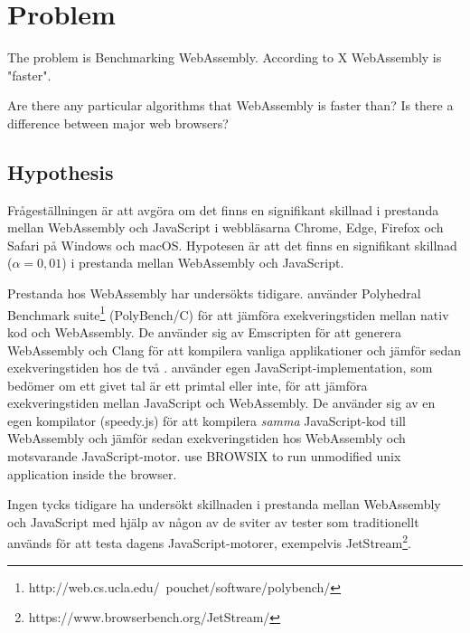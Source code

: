 \section{Problem}

The problem is Benchmarking WebAssembly. According to X WebAssembly is "faster". 

Are there any particular algorithms that WebAssembly is faster than?
Is there a difference between major web browsers?


\subsection{Hypothesis}

Frågeställningen är att avgöra om det finns en signifikant skillnad i prestanda mellan WebAssembly och JavaScript i webbläsarna Chrome, Edge, Firefox och Safari på Windows och macOS. Hypotesen är att det finns en signifikant skillnad ($\alpha = 0,01$) i prestanda mellan WebAssembly och JavaScript.

Prestanda hos WebAssembly har undersökts tidigare. \textcite{HaasRossbergSchuffTitzerHolmanGohmanWagnerZakaiBastien2017} använder Polyhedral Benchmark suite\footnote{http://web.cs.ucla.edu/~pouchet/software/polybench/} (PolyBench/C) för att jämföra exekveringstiden mellan nativ kod och WebAssembly. De använder sig av Emscripten för att generera WebAssembly och Clang \parencite{LattnerAdve2014} för att kompilera vanliga applikationer och jämför sedan exekveringstiden hos de två \parencite{HaasRossbergSchuffTitzerHolmanGohmanWagnerZakaiBastien2017}. \textcite{ReiserBlaser2017} använder egen JavaScript-implementation, som bedömer om ett givet tal är ett primtal eller inte, för att jämföra exekveringstiden mellan JavaScript och WebAssembly. De använder sig av en egen kompilator (speedy.js) för att kompilera \emph{samma} JavaScript-kod till WebAssembly och jämför sedan exekveringstiden hos WebAssembly och motsvarande JavaScript-motor. \textcite{JangdaPowersGuhaBerger2019} use BROWSIX to run unmodified unix application inside the browser.

Ingen tycks tidigare ha undersökt skillnaden i prestanda mellan WebAssembly och JavaScript med hjälp av någon av de sviter av tester som traditionellt används för att testa dagens JavaScript-motorer, exempelvis JetStream\footnote{https://www.browserbench.org/JetStream/}.
